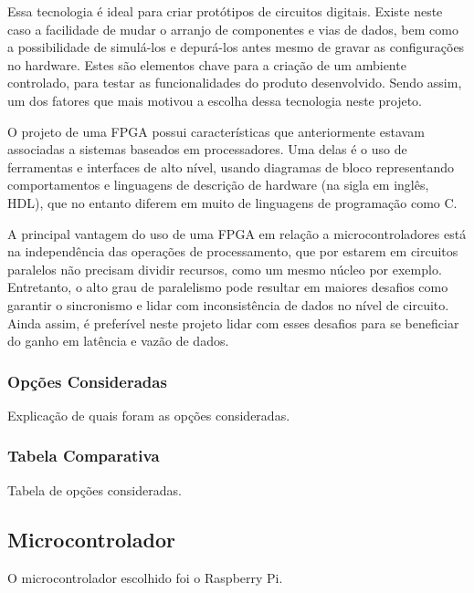 	Essa tecnologia é ideal para criar protótipos de circuitos digitais. Existe neste caso a facilidade de mudar o arranjo de componentes e vias de dados, bem como a possibilidade de simulá-los e depurá-los antes mesmo de gravar as configurações no hardware. Estes são elementos chave para a criação de um ambiente controlado, para testar as funcionalidades do produto desenvolvido. Sendo assim, um dos fatores que mais motivou a escolha dessa tecnologia neste projeto.
	
	O projeto de uma FPGA possui características que anteriormente estavam associadas a sistemas baseados em processadores. Uma delas é o uso de ferramentas e interfaces de alto nível, usando diagramas de bloco representando comportamentos e linguagens de descrição de hardware (na sigla em inglês, HDL), que no entanto diferem em muito de linguagens de programação como C. 
	
	A principal vantagem do uso de uma FPGA em relação a microcontroladores está na independência das operações de processamento, que por estarem em circuitos paralelos não precisam dividir recursos, como um mesmo núcleo por exemplo. Entretanto, o alto grau de paralelismo pode resultar em maiores desafios como garantir o sincronismo e lidar com inconsistência de dados no nível de circuito. Ainda assim, é preferível neste projeto lidar com esses desafios para se beneficiar do ganho em latência e vazão de dados.
	
	\subsubsection{Opções Consideradas}\label{fpga-options}
	
	Explicação de quais foram as opções consideradas.
	
	\subsubsection{Tabela Comparativa}\label{fpga-table}
	
	Tabela de opções consideradas.
	
	\subsection{Microcontrolador}\label{hard-uc}
	
	O microcontrolador escolhido foi o Raspberry Pi.

	
